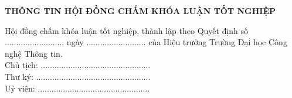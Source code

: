 \thispagestyle{empty}
\begin{center}
    {   \par 
        \textbf{THÔNG TIN HỘI ĐỒNG CHẤM KHÓA LUẬN TỐT NGHIỆP} \par}
    \end{center}
    \begin{justifying}
        Hội đồng chấm khóa luận tốt nghiệp, thành lập theo Quyết định số .......................... ngày .......................... của Hiệu trưởng Trường Đại học Công nghệ Thông tin. \\
        Chủ tịch: ................................................  \\
        Thư ký: ..................................................  \\
        Uỷ viên: .................................................  \\
\end{justifying}